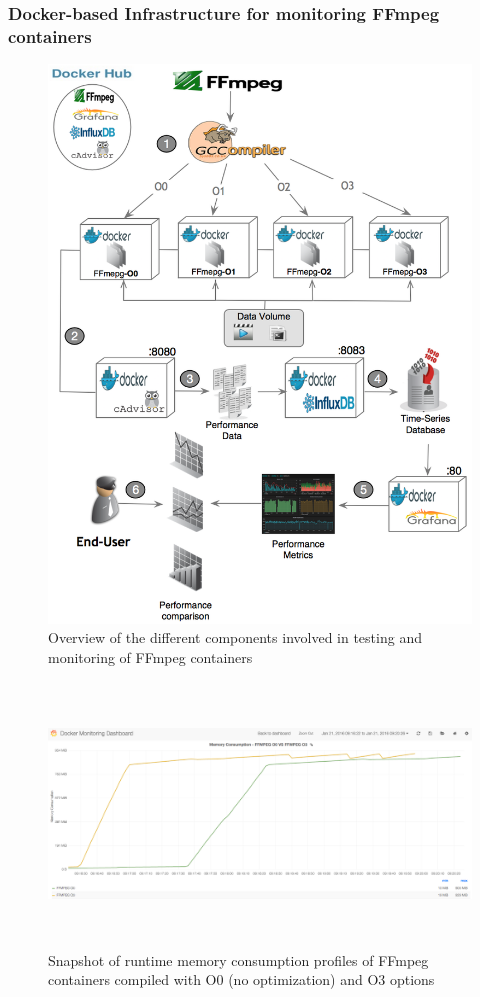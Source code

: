 \subsubsection{Docker-based Infrastructure for monitoring FFmpeg containers}
\begin{figure}[h]
	\centering
	\includegraphics[scale=0.48]{Ressources/infra_ffmpeg.png}
	\caption{Overview of the different components involved in testing and monitoring of FFmpeg containers}
\end{figure}
\begin{figure}
	
	\center
	
	\includegraphics[width=15cm,height=7cm]{Ressources/infra_stats.png}
	\caption{Snapshot of runtime memory consumption profiles of FFmpeg containers compiled with O0 (no optimization) and O3 options}
	
	\label{AAA}
	
\end{figure}
